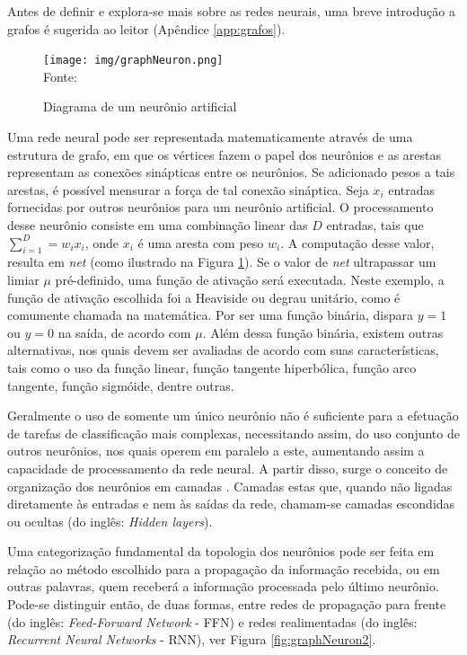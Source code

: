Antes de definir e explora-se mais sobre as redes neurais, uma breve introdução a grafos é sugerida ao leitor (Apêndice \ref{app:grafos}). 

\begin{figure}[ht!]
\caption{Diagrama de um neurônio artificial}
\label{fig:graphNeuron}
\centering
\texttt{[image: img/graphNeuron.png]}
{\fontsize{11pt}{\baselineskip}\selectfont
\\Fonte: \cite{Rauber2005}
}
\end{figure}

Uma rede neural pode ser representada matematicamente através de uma estrutura de grafo, em que os vértices fazem o papel dos neurônios e as arestas representam as conexões sinápticas entre os neurônios. Se adicionado pesos a tais arestas, é possível mensurar a força de tal conexão sináptica. Seja $x_i$ entradas fornecidas por outros neurônios para um neurônio artificial. O processamento desse neurônio consiste em uma combinação linear das $D$ entradas, tais que $\sum_{i=1}^{D} = w_i x_i$, onde $x_i$ é uma aresta com peso $w_i$. A computação desse valor, resulta em \textit{net} (como ilustrado na Figura \ref{fig:graphNeuron}). Se o valor de \textit{net} ultrapassar um limiar $\mu$ pré-definido, uma função de ativação será executada. Neste exemplo, a função de ativação escolhida foi a Heaviside ou degrau unitário, como é comumente chamada na matemática. Por ser uma função binária, dispara $y = 1$ ou $y = 0$ na saída, de acordo com $\mu$. Além dessa função binária, existem outras alternativas, nos quais devem ser avaliadas de acordo com suas características, tais como o uso da função linear, função tangente hiperbólica, função arco tangente, função sigmóide, dentre outras.
 
Geralmente o uso de somente um único neurônio não é suficiente para a efetuação de tarefas de classificação mais complexas, necessitando assim, do uso conjunto de outros neurônios, nos quais operem em paralelo a este, aumentando assim a capacidade de processamento da rede neural. A partir disso, surge o conceito de organização dos neurônios em camadas \citep{duda1973pattern, bishop2006pattern, martin2018speech}. Camadas estas que, quando não ligadas diretamente às entradas e nem às saídas da rede, chamam-se camadas escondidas ou ocultas (do inglês: \textit{Hidden layers}). 
 
Uma categorização fundamental da topologia dos neurônios pode ser feita em relação ao método escolhido para a propagação da informação recebida, ou em outras palavras, quem receberá a informação processada pelo último neurônio. Pode-se distinguir então, de duas formas, entre redes de propagação para frente (do inglês: \textit{Feed-Forward Network} - FFN) e redes realimentadas (do inglês: \textit{Recurrent Neural Networks} - RNN), ver Figura \ref{fig:graphNeuron2}.
 

